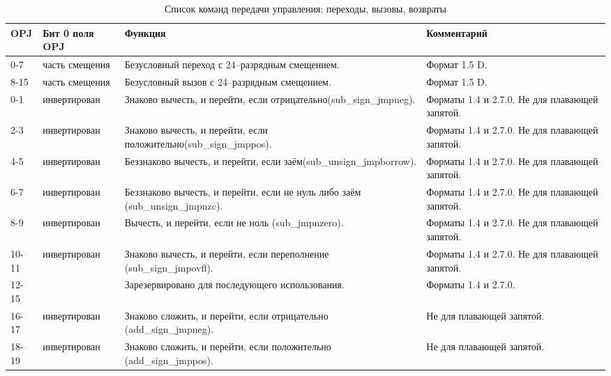 \documentclass[forwardcom.tex]{subfiles}
\begin{document}
\begin{longtable}{|p{10mm}|p{18mm}|p{80mm}|p{35mm}|}
\caption{Список команд передачи управления: переходы, вызовы, возвраты}
\label{table:controlTransferInstructions}
\endfirsthead
\endhead
\hline
OPJ   & Бит 0 поля OPJ & Функция                                                           & Комментарий   \\ \hline
0-7   & часть смещения & Безусловный переход с 24--разрядным смещением.                    & Формат 1.5 D. \\ \hline
8-15  & часть смещения & Безусловный вызов с 24--разрядным смещением.                      & Формат 1.5 D. \\ \hline
0-1   & ин\-вер\-ти\-ро\-ван   & Знаково вычесть, и перейти, если отрицательно\newline (sub\_sign\_jmpneg).    & Форматы 1.4 и 2.7.0. Не для плавающей запятой. \\ \hline
2-3   & ин\-вер\-ти\-ро\-ван   & Знаково вычесть, и перейти, если положительно\newline (sub\_sign\_jmppos).    & Форматы 1.4 и 2.7.0. Не для плавающей запятой. \\ \hline
4-5   & ин\-вер\-ти\-ро\-ван   & Беззнаково вычесть, и перейти, если заём\newline (sub\_unsign\_jmpborrow).    & Форматы 1.4 и 2.7.0. Не для плавающей запятой. \\ \hline
6-7   & ин\-вер\-ти\-ро\-ван    & Беззнаково вычесть, и перейти, если не нуль либо заём (sub\_unsign\_jmpnzc). & Форматы 1.4 и 2.7.0. Не для плавающей запятой. \\ \hline
8-9   & ин\-вер\-ти\-ро\-ван    & Вычесть, и перейти, если не ноль (sub\_jmpnzero).                            &  Форматы 1.4 и 2.7.0. Не для плавающей запятой. \\ \hline
10-11 & ин\-вер\-ти\-ро\-ван    & Знаково вычесть, и перейти, если переполнение (sub\_sign\_jmpovfl).          & Форматы 1.4 и 2.7.0. Не для плавающей запятой. \\ \hline
12-15 & & Зарезервировано для последующего использования. & Форматы 1.4 и 2.7.0. \\ \hline
16-17 & ин\-вер\-ти\-ро\-ван    & Знаково сложить, и перейти, если отрицательно (add\_sign\_jmpneg).           & Не для плавающей запятой. \\ \hline
18-19 & ин\-вер\-ти\-ро\-ван    & Знаково сложить, и перейти, если положительно (add\_sign\_jmppos).           & Не для плавающей запятой. \\ \hline

\end{longtable}
\end{document}
